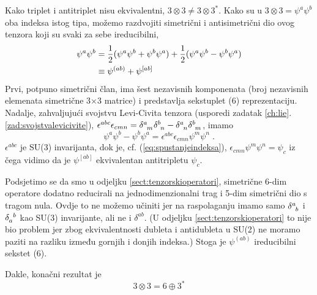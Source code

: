 \begin{primjer}[$3\otimes 3$]
Kako triplet i antitriplet nisu ekvivalentni, $3\otimes 3
\neq 3\otimes 3^*$. Kako su u
$3\otimes 3 = \psi^a \psi^b$ oba indeksa istog tipa,
možemo razdvojiti simetrični i antisimetrični dio ovog
tenzora koji su svaki za sebe ireducibilni,
\begin{align}
\psi^a \psi^b &= \frac{1}{2} (\psi^a\psi^b + \psi^b \psi^a)
               + \frac{1}{2} (\psi^a\psi^b - \psi^b \psi^a) \\
              &\equiv \psi^{(ab)} + \psi^{[ab]}
\end{align}
Prvi, potpuno simetrični član, ima šest nezavisnih komponenata
(broj nezavisnih elemenata simetrične 3$\times$3 matrice) i
predstavlja sekstuplet (6) reprezentaciju.
Nadalje, zahvaljujući svojstvu Levi-Civita tenzora
(usporedi zadatak \ref{ch:lie}.\ref{zad:svojstvalevicivite}),
$\epsilon^{abc}\epsilon_{cmn} = 
\tensor{\delta}{^a_m}
\tensor{\delta}{^b_n} -
\tensor{\delta}{^a_n}
\tensor{\delta}{^b_m}$, imamo
\begin{equation}
\psi^a\psi^b - \psi^b \psi^a = \epsilon^{abc}\epsilon_{cmn}
\psi^m\psi^n \;.
\end{equation}
$\epsilon^{abc}$ je SU(3) invarijanta, dok je, cf. 
(\ref{eq:spustanjeindeksa}), $\epsilon_{cmn}\psi^{m}\psi^n = \psi_c$
iz čega vidimo da je $\psi^{[ab]}$ ekvivalentan antitripletu
$\psi_c$. 

Podsjetimo se da smo u odjeljku \ref{sect:tenzorskioperatori},
simetrične 6-dim operatore dodatno reducirali na jednodimenzionalni
trag i 5-dim simetrični dio s tragom nula.  Ovdje to ne možemo učiniti
jer na raspolaganju imamo samo 
$\tensor{\delta}{^a_b}$ i $\tensor{\delta}{_a^b}$ kao SU(3) invarijante, 
ali ne i $\delta^{ab}$. (U odjeljku \ref{sect:tenzorskioperatori}
to nije bio problem jer zbog ekvivalentnosti dubleta i antidubleta u
SU(2) ne moramo paziti na razliku između gornjih i donjih indeksa.)
Stoga je $\psi^{(ab)}$ ireducibilni sekstet (6).

Dakle, konačni rezultat je
\begin{equation}
 3 \otimes 3 = 6 \oplus 3^*
\label{eq:33eq63}
\end{equation}
\end{primjer}

